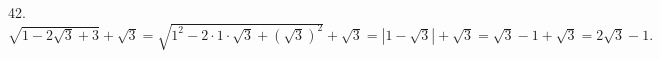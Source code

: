 42. $\sqrt{1-2\sqrt{3}+3}+\sqrt{3}=\sqrt{1^2-2\cdot1\cdot\sqrt{3}+(\sqrt{3})^2}+\sqrt{3}=|1-\sqrt{3}|+\sqrt{3}=\sqrt{3}-1+\sqrt{3}=2\sqrt{3}-1.$\\
